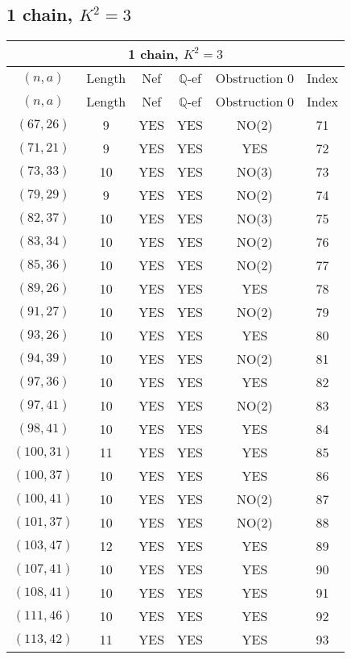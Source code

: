 \subsection{1 chain, $K^2 = 3$}
\begin{longtable}{|c|c|c|c|c|c|}
\hline
\multicolumn{6}{|c|}{1 chain, $K^2 = 3$}\\
\hline
$(n,a)$ & Length & Nef & $\mathbb Q$-ef & Obstruction 0 & Index\\
\hline
\endfirsthead

\hline
$(n,a)$ & Length & Nef & $\mathbb Q$-ef & Obstruction 0 & Index\\
\hline
\endhead
\hline
\endfoot

$(67, 26)$ & 9 & YES & YES & NO(2) & 71\\
$(71, 21)$ & 9 & YES & YES & YES & 72\\
$(73, 33)$ & 10 & YES & YES & NO(3) & 73\\
$(79, 29)$ & 9 & YES & YES & NO(2) & 74\\
$(82, 37)$ & 10 & YES & YES & NO(3) & 75\\
$(83, 34)$ & 10 & YES & YES & NO(2) & 76\\
$(85, 36)$ & 10 & YES & YES & NO(2) & 77\\
$(89, 26)$ & 10 & YES & YES & YES & 78\\
$(91, 27)$ & 10 & YES & YES & NO(2) & 79\\
$(93, 26)$ & 10 & YES & YES & YES & 80\\
$(94, 39)$ & 10 & YES & YES & NO(2) & 81\\
$(97, 36)$ & 10 & YES & YES & YES & 82\\
$(97, 41)$ & 10 & YES & YES & NO(2) & 83\\
$(98, 41)$ & 10 & YES & YES & YES & 84\\
$(100, 31)$ & 11 & YES & YES & YES & 85\\
$(100, 37)$ & 10 & YES & YES & YES & 86\\
$(100, 41)$ & 10 & YES & YES & NO(2) & 87\\
$(101, 37)$ & 10 & YES & YES & NO(2) & 88\\
$(103, 47)$ & 12 & YES & YES & YES & 89\\
$(107, 41)$ & 10 & YES & YES & YES & 90\\
$(108, 41)$ & 10 & YES & YES & YES & 91\\
$(111, 46)$ & 10 & YES & YES & YES & 92\\
$(113, 42)$ & 11 & YES & YES & YES & 93\\

\end{longtable}
